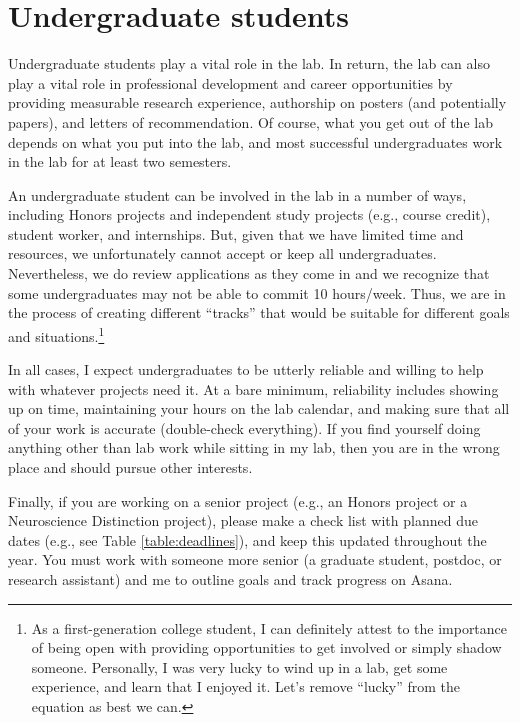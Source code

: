 \documentclass[letterpaper,11pt,oneside]{memoir}
\begin{document}
\section{Undergraduate students}

Undergraduate students play a vital role in the lab. In return, the lab can also play a vital role in professional development and career opportunities by providing measurable research experience, authorship on posters (and potentially papers), and letters of recommendation. Of course, what you get out of the lab depends on what you put into the lab, and most successful undergraduates work in the lab for at least two semesters. 

An undergraduate student can be involved in the lab in a number of ways, including Honors projects and independent study projects (e.g., course credit), student worker, and internships. But, given that we have limited time and resources, we unfortunately cannot accept or keep all undergraduates. Nevertheless, we do review applications as they come in and we recognize that some undergraduates may not be able to commit 10 hours/week. Thus, we are in the process of creating different ``tracks'' that would be suitable for different goals and situations.\footnote{As a first-generation college student, I can definitely attest to the importance of being open with providing opportunities to get involved or simply shadow someone. Personally, I was very lucky to wind up in a lab, get some experience, and learn that I enjoyed it. Let's remove ``lucky'' from the equation as best we can.}

In all cases, I expect undergraduates to be utterly reliable and willing to help with whatever projects need it. At a bare minimum, reliability includes showing up on time, maintaining your hours on the lab calendar, and making sure that all of your work is accurate (double-check everything). If you find yourself doing anything other than lab work while sitting in my lab, then you are in the wrong place and should pursue other interests.

Finally, if you are working on a senior project (e.g., an Honors project or a Neuroscience Distinction project), please make a check list with planned due dates (e.g., see Table \ref{table:deadlines}), and keep this updated throughout the year. You must work with someone more senior (a graduate student, postdoc, or research assistant) and me to outline goals and track progress on Asana.
\end{document}
